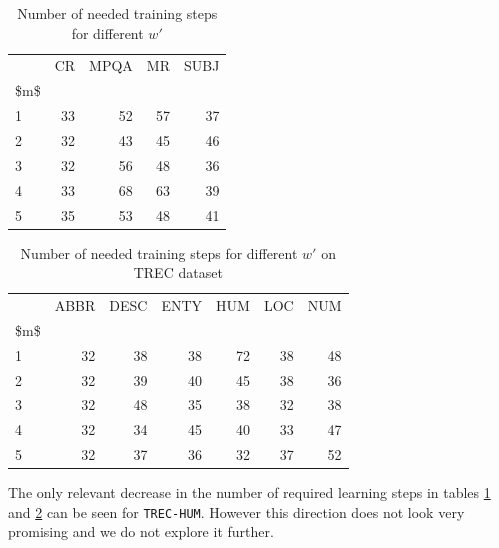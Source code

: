 \begin{table}[H]
\begin{center}

\begin{tabular}{lrrrr}
\toprule
{} & CR & MPQA & MR & SUBJ \\
\$m\$ &      &       &      &       \\
\midrule
1  &     33 &      52 &     57 &      37 \\
2  &     32 &      43 &     45 &      46 \\
3  &     32 &      56 &     48 &      36 \\
4  &     33 &      68 &     63 &      39 \\
5  &     35 &      53 &     48 &      41 \\
\bottomrule
\end{tabular}

\caption[Number of needed training steps for different $w'$]{Number of needed training steps for different $w'$}
\label{tab:multyw:steps}
\end{center}
\end{table}


\begin{table}[H]
\begin{center}

\begin{tabular}{lrrrrrr}
\toprule
{} & ABBR & DESC & ENTY & HUM & LOC & NUM \\
\$m\$ &          &          &          &         &         &         \\
\midrule
1  &        32 &        38 &        38 &        72 &        38 &        48 \\
2  &        32 &        39 &        40 &        45 &        38 &        36 \\
3  &        32 &        48 &        35 &        38 &        32 &        38 \\
4  &        32 &        34 &        45 &        40 &        33 &        47 \\
5  &        32 &        37 &        36 &        32 &        37 &        52 \\
\bottomrule
\end{tabular}

\caption[Number of needed training steps for different $w'$ on TREC dataset]{Number of needed training steps for different $w'$ on TREC dataset}
\label{tab:multyw:steps:trec}
\end{center}
\end{table}

    The only relevant decrease in the number of required learning steps in tables \ref{tab:multyw:steps} and \ref{tab:multyw:steps:trec} can be seen for \texttt{TREC-HUM}.
    However this direction does not look very promising and we do not explore it further.
    